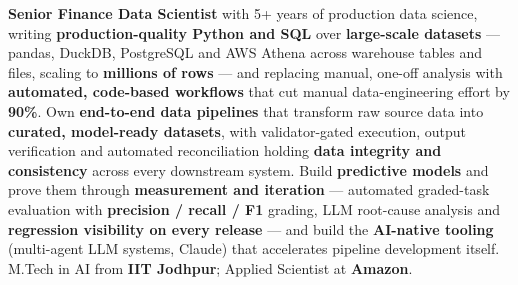 \documentclass[letter,10pt]{article}
\begin{document}
%

\textbf{Senior Finance Data Scientist} with 5+ years of production data science, writing \textbf{production-quality Python and SQL} over \textbf{large-scale datasets} --- pandas, DuckDB, PostgreSQL and AWS Athena across warehouse tables and files, scaling to \textbf{millions of rows} --- and replacing manual, one-off analysis with \textbf{automated, code-based workflows} that cut manual data-engineering effort by \textbf{90\%}.
Own \textbf{end-to-end data pipelines} that transform raw source data into \textbf{curated, model-ready datasets}, with validator-gated execution, output verification and automated reconciliation holding \textbf{data integrity and consistency} across every downstream system.
Build \textbf{predictive models} and prove them through \textbf{measurement and iteration} --- automated graded-task evaluation with \textbf{precision / recall / F1} grading, LLM root-cause analysis and \textbf{regression visibility on every release} --- and build the \textbf{AI-native tooling} (multi-agent LLM systems, Claude) that accelerates pipeline development itself.
M.Tech in AI from \textbf{IIT Jodhpur}; Applied Scientist at \textbf{Amazon}.
\end{document}
